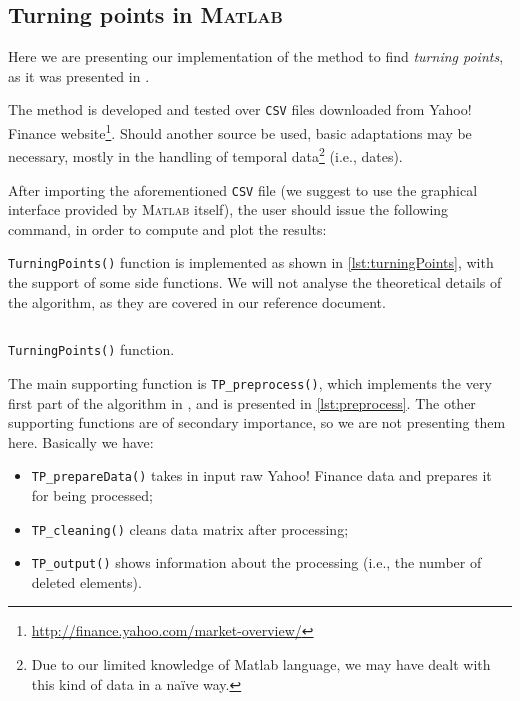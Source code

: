 \documentclass[a4paper]{article}
\newcommand{\matlab}{\textsc{Matlab}\xspace}
\newcommand{\csv}{\texttt{CSV}\xspace}
\begin{document}
\lipsum[7]

\subsection{Turning points in \matlab}

Here we are presenting our implementation of the method to find \emph{turning points}, as it was presented in \cite{5961935}.%

The method is developed and tested over \csv files downloaded from Yahoo! Finance website\footnote{\url{http://finance.yahoo.com/market-overview/}}. Should another source be used, basic adaptations may be necessary, mostly in the handling of temporal data\footnote{Due to our limited knowledge of Matlab language, we may have dealt with this kind of data in a na{\"i}ve way.} (i.e., dates). 

After importing the aforementioned \csv file (we suggest to use the graphical interface provided by \matlab itself), the user should issue the following command, in order to compute and plot the results: 

\texttt{TurningPoints()} function is implemented as shown in \cref{lst:turningPoints}, with the support of some side functions. We will not analyse the theoretical details of the algorithm, as they are covered in our reference document.

\begin{listing}[H]
 
\inputminted[firstline = 1, lastline = 50]{matlab}{../code/TurningPoints.m}

\caption{\texttt{TurningPoints()} function.}\label{lst:turningPoints}

\end{listing}

The main supporting function is \texttt{TP\_preprocess()}, which implements the very first part of the algorithm in \cite{5961935}, and is presented in \cref{lst:preprocess}. The other supporting functions are of secondary importance, so we are not presenting them here. Basically we have: \begin{itemize}
	\item \texttt{TP\_prepareData()} takes in input raw Yahoo! Finance data and prepares it for being processed;
	\item \texttt{TP\_cleaning()} cleans data matrix after processing;
	\item \texttt{TP\_output()} shows information about the processing (i.e., the number of deleted elements).
\end{itemize} 
\end{document}
